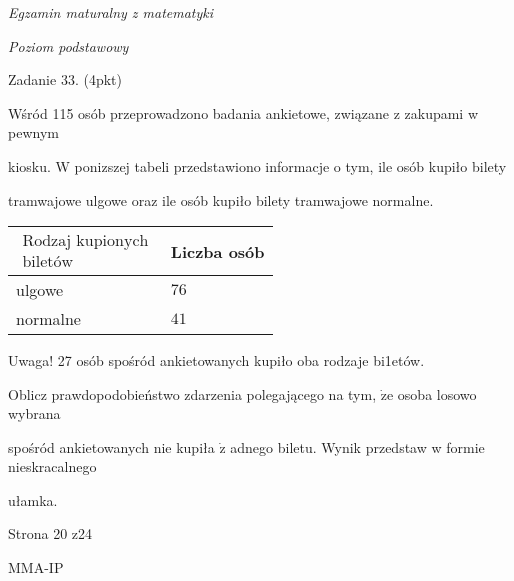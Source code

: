 \documentclass[a4paper,12pt]{article}
\begin{document}
{\it Egzamin maturalny z matematyki}

{\it Poziom podstawowy}

Zadanie 33. (4pkt)

Wśród 115 osób przeprowadzono badania ankietowe, związane z zakupami w pewnym

kiosku. W ponizszej tabeli przedstawiono informacje o tym, ile osób kupiło bilety

tramwajowe ulgowe oraz ile osób kupiło bilety tramwajowe normalne.
\begin{center}
\begin{tabular}{|l|l|}
\hline
\multicolumn{1}{|l|}{$\begin{array}{l}\mbox{Rodzaj kupionych}	\\	\mbox{biletów}	\end{array}$}&	\multicolumn{1}{|l|}{Liczba osób}	\\
\hline
\multicolumn{1}{|l|}{ulgowe}&	\multicolumn{1}{|l|}{$76$}	\\
\hline
\multicolumn{1}{|l|}{normalne}&	\multicolumn{1}{|l|}{$41$}	\\
\hline
\end{tabular}

\end{center}
Uwaga! 27 osób spośród ankietowanych kupiło oba rodzaje bi1etów.

Oblicz prawdopodobieństwo zdarzenia polegającego na tym, $\dot{\mathrm{z}}\mathrm{e}$ osoba losowo wybrana

spośród ankietowanych nie kupiła $\dot{\mathrm{z}}$ adnego biletu. Wynik przedstaw w formie nieskracalnego

ułamka.

Strona 20 z24

MMA-IP
\end{document}
